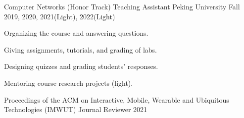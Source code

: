 \documentclass[11pt, a4paper]{awesome-cv}
\begin{document}
\newpage
{}
\begin{cventries}
	
	\cventry
	{Computer Networks (Honor Track)}
	{Teaching Assistant}
	{Peking University}
	{Fall 2019, 2020, 2021(Light), 2022(Light)}
	{
		\begin{cvitems} %
			\item {Organizing the course and answering questions.}
			\item {Giving assignments, tutorials, and grading of labs.}
			\item {Designing quizzes and grading students' responses.}
			\item {Mentoring course research projects (light).}
		\end{cvitems}
	}
	
	\cventry
	{Proceedings of the ACM on Interactive, Mobile, Wearable and Ubiquitous Technologies (IMWUT)} %
	{Journal Reviewer} %
	{} %
	{2021} %
	{}	
	
\end{cventries}

%
%
%
%
%
%
%
%


\end{document}
